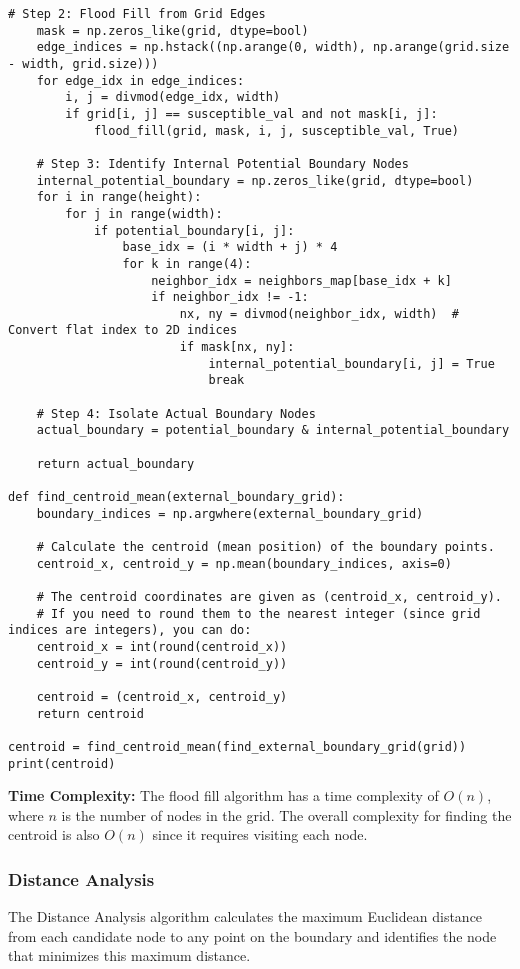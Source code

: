 \begin{lstlisting}[caption=Center of Mass Algorithm, label=lst:center-of-mass]
    # Step 2: Flood Fill from Grid Edges
    mask = np.zeros_like(grid, dtype=bool)
    edge_indices = np.hstack((np.arange(0, width), np.arange(grid.size - width, grid.size)))
    for edge_idx in edge_indices:
        i, j = divmod(edge_idx, width)
        if grid[i, j] == susceptible_val and not mask[i, j]:
            flood_fill(grid, mask, i, j, susceptible_val, True)

    # Step 3: Identify Internal Potential Boundary Nodes
    internal_potential_boundary = np.zeros_like(grid, dtype=bool)
    for i in range(height):
        for j in range(width):
            if potential_boundary[i, j]:
                base_idx = (i * width + j) * 4
                for k in range(4):
                    neighbor_idx = neighbors_map[base_idx + k]
                    if neighbor_idx != -1:
                        nx, ny = divmod(neighbor_idx, width)  # Convert flat index to 2D indices
                        if mask[nx, ny]:
                            internal_potential_boundary[i, j] = True
                            break

    # Step 4: Isolate Actual Boundary Nodes
    actual_boundary = potential_boundary & internal_potential_boundary

    return actual_boundary

def find_centroid_mean(external_boundary_grid):
    boundary_indices = np.argwhere(external_boundary_grid)
    
    # Calculate the centroid (mean position) of the boundary points.
    centroid_x, centroid_y = np.mean(boundary_indices, axis=0)
    
    # The centroid coordinates are given as (centroid_x, centroid_y).
    # If you need to round them to the nearest integer (since grid indices are integers), you can do:
    centroid_x = int(round(centroid_x))
    centroid_y = int(round(centroid_y))
    
    centroid = (centroid_x, centroid_y)
    return centroid
    
centroid = find_centroid_mean(find_external_boundary_grid(grid))
print(centroid)
\end{lstlisting}

\textbf{Time Complexity:} The flood fill algorithm has a time complexity of \(O(n)\), where \(n\) is the number of nodes in the grid. The overall complexity for finding the centroid is also \(O(n)\) since it requires visiting each node.

\subsubsection{Distance Analysis}
The Distance Analysis algorithm calculates the maximum Euclidean distance from each candidate node to any point on the boundary and identifies the node that minimizes this maximum distance.

